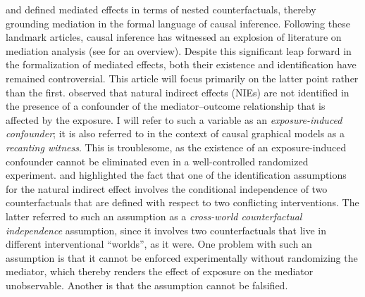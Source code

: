 \documentclass[12pt]{article}
\begin{document}
\cite{robins1992identifiability} and \cite{pearl2001direct} defined mediated effects in terms of nested counterfactuals, thereby grounding mediation in the formal language of causal inference. Following these landmark articles, causal inference has witnessed an explosion of literature on mediation analysis (see \cite{vanderweele2015explanation} for an overview). 
Despite this significant leap forward in the formalization of mediated effects, both their existence and identification have remained controversial. This article will focus primarily on the latter point rather than the first. \cite{pearl2001direct} observed that natural indirect effects (NIEs) are not identified in the presence of a confounder of the mediator--outcome relationship that is affected by the exposure. I will refer to such a variable as an \emph{exposure-induced confounder}; it is also referred to in the context of causal graphical models as a \emph{recanting witness}. This is troublesome, as the existence of an exposure-induced confounder cannot be eliminated even in a well-controlled randomized experiment. \cite{robins2003semantics} and \cite{robins2010alternative} highlighted the fact that one of the identification assumptions for the natural indirect effect involves the conditional independence of two counterfactuals that are defined with respect to two conflicting interventions. The latter referred to such an assumption as a \emph{cross-world counterfactual independence} assumption, since it involves two counterfactuals that live in different interventional ``worlds'', as it were. One problem with such an assumption is that %
it cannot be enforced experimentally without randomizing the mediator, which thereby renders the effect of exposure on the mediator unobservable. Another is that the assumption cannot be falsified.
\end{document}
